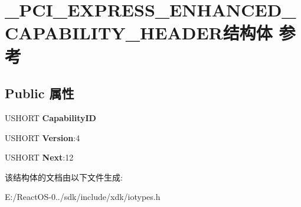 \hypertarget{struct___p_c_i___e_x_p_r_e_s_s___e_n_h_a_n_c_e_d___c_a_p_a_b_i_l_i_t_y___h_e_a_d_e_r}{}\section{\+\_\+\+P\+C\+I\+\_\+\+E\+X\+P\+R\+E\+S\+S\+\_\+\+E\+N\+H\+A\+N\+C\+E\+D\+\_\+\+C\+A\+P\+A\+B\+I\+L\+I\+T\+Y\+\_\+\+H\+E\+A\+D\+E\+R结构体 参考}
\label{struct___p_c_i___e_x_p_r_e_s_s___e_n_h_a_n_c_e_d___c_a_p_a_b_i_l_i_t_y___h_e_a_d_e_r}
\subsection*{Public 属性}
\begin{DoxyCompactItemize}
\item 
\mbox{\label{struct___p_c_i___e_x_p_r_e_s_s___e_n_h_a_n_c_e_d___c_a_p_a_b_i_l_i_t_y___h_e_a_d_e_r_a2ae4051f8a30b076c70c5e701bd21cee}} 
U\+S\+H\+O\+RT {\bfseries Capability\+ID}
\item 
\mbox{\label{struct___p_c_i___e_x_p_r_e_s_s___e_n_h_a_n_c_e_d___c_a_p_a_b_i_l_i_t_y___h_e_a_d_e_r_ac69d1f27a56db0eeac3211feb426805a}} 
U\+S\+H\+O\+RT {\bfseries Version}\+:4
\item 
\mbox{\label{struct___p_c_i___e_x_p_r_e_s_s___e_n_h_a_n_c_e_d___c_a_p_a_b_i_l_i_t_y___h_e_a_d_e_r_a1a67973eaff203f23eef2da9bd528e8e}} 
U\+S\+H\+O\+RT {\bfseries Next}\+:12
\end{DoxyCompactItemize}


该结构体的文档由以下文件生成\+:\begin{DoxyCompactItemize}
\item 
E\+:/\+React\+O\+S-\/0../sdk/include/xdk/iotypes.\+h\end{DoxyCompactItemize}
